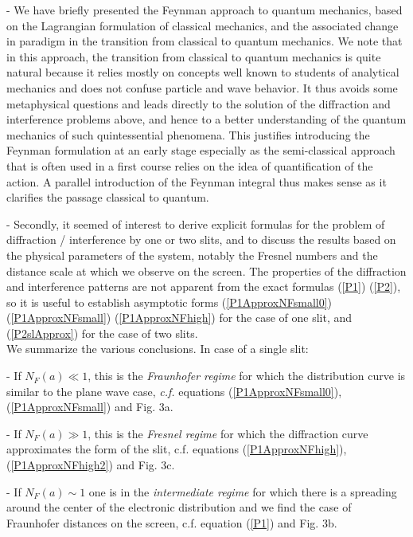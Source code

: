 \documentclass[12pt,aps,prb,preprint]{revtex4-1}   %
\begin{document}
- We have briefly presented the Feynman approach to quantum
mechanics, based on the Lagrangian formulation of classical
mechanics, and the associated change in paradigm in the transition
from classical to quantum mechanics. We note that in this
approach, the transition from classical to quantum mechanics is
quite natural because it relies mostly on concepts well known to
students of analytical mechanics and does not confuse particle and
wave behavior. It thus avoids some metaphysical questions and
leads directly to the solution of the diffraction and interference
problems above, and hence to a better understanding of the quantum
mechanics of such quintessential phenomena. This justifies
introducing the Feynman formulation at an early stage especially
as the semi-classical approach that is often used in a first
course relies on the idea of  quantification of the action. A
parallel introduction of the Feynman integral thus makes sense as
it clarifies the passage classical to quantum.

 - Secondly, it seemed of interest to derive explicit formulas for the problem
of diffraction / interference by one or two slits, and to discuss
the results based on the physical parameters of the system,
notably the Fresnel numbers and the distance scale at which we
observe on the screen. The properties of the diffraction and
interference patterns are not apparent from the exact formulas
(\ref{P1}) (\ref{P2}), so it is useful to establish asymptotic
forms (\ref{P1ApproxNFsmall0}) (\ref{P1ApproxNFsmall})
(\ref{P1ApproxNFhigh}) for the case of
one slit, and (\ref{P2slApprox}) for the case of two slits.\\

We summarize the various conclusions. In case of a single slit:

 - If $N_F(a)\ll 1$, this is the \textit{Fraunhofer regime} for which the distribution
curve is similar to the plane wave case, \textit{c.f.} equations
(\ref{P1ApproxNFsmall0}), (\ref{P1ApproxNFsmall}) and Fig. 3a.

 - If $N_F(a)\gg1$, this is the \textit{Fresnel regime} for which the diffraction
curve approximates the form of the slit, c.f. equations
(\ref{P1ApproxNFhigh}), (\ref{P1ApproxNFhigh2}) and Fig. 3c.

 - If $N_F(a)\sim 1$ one is in the \textit{intermediate regime} for which there is
a spreading around the center of the electronic distribution and
we find the case of Fraunhofer distances on the
screen, c.f. equation (\ref{P1}) and Fig. 3b. \\
\end{document}
